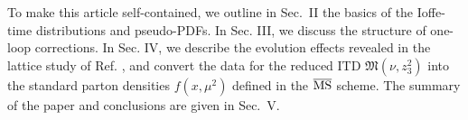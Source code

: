  To make this article  self-contained, we outline  in \mbox{Sec. II}
 the basics of  the Ioffe-time distributions and pseudo-PDFs.
 In Sec.  III, we discuss the structure of  one-loop corrections.
 In Sec.  IV, we  describe the evolution effects
 revealed  in the lattice study of Ref. \cite{Orginos:2017kos},
 and convert the data for  the reduced ITD ${\mathfrak M} (\nu, z_3^2)$
 into the standard parton densities $f(x,\mu^2)$ defined in the $\overline{\rm MS}$  scheme.
 The summary of the paper and conclusions  are  given in \mbox{Sec.  V.}
